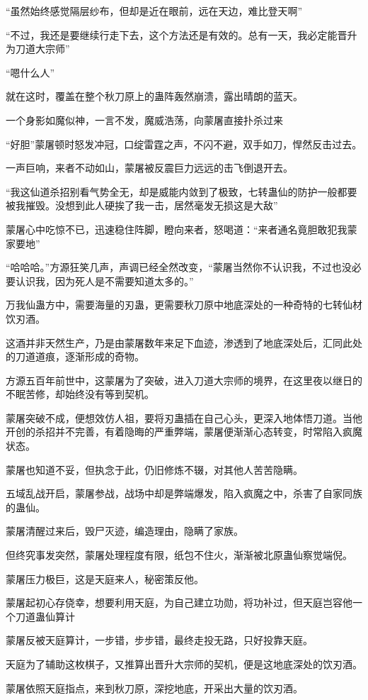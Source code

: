 \begin{this_body}
“虽然始终感觉隔层纱布，但却是近在眼前，远在天边，难比登天啊”

“不过，我还是要继续行走下去，这个方法还是有效的。总有一天，我必定能晋升为刀道大宗师”

“嗯什么人”

就在这时，覆盖在整个秋刀原上的蛊阵轰然崩溃，露出晴朗的蓝天。

一个身影如魔似神，一言不发，魔威浩荡，向蒙屠直接扑杀过来

“好胆”蒙屠顿时怒发冲冠，口绽雷霆之声，不闪不避，双手如刀，悍然反击过去。

一声巨响，来者不动如山，蒙屠被反震巨力远远的击飞倒退开去。

“我这仙道杀招别看气势全无，却是威能内敛到了极致，七转蛊仙的防护一般都要被我摧毁。没想到此人硬挨了我一击，居然毫发无损这是大敌”

蒙屠心中吃惊不已，迅速稳住阵脚，瞪向来者，怒喝道：“来者通名竟胆敢犯我蒙家要地”

“哈哈哈。”方源狂笑几声，声调已经全然改变，“蒙屠当然你不认识我，不过也没必要认识我，因为死人是不需要知道太多的。”

万我仙蛊方中，需要海量的刃蛊，更需要秋刀原中地底深处的一种奇特的七转仙材饮刃酒。

这酒并非天然生产，乃是由蒙屠数年来足下血迹，渗透到了地底深处后，汇同此处的刀道道痕，逐渐形成的奇物。

方源五百年前世中，这蒙屠为了突破，进入刀道大宗师的境界，在这里夜以继日的不眠苦修，却始终没有等到契机。

蒙屠突破不成，便想效仿人祖，要将刃蛊插在自己心头，更深入地体悟刀道。当他开创的杀招并不完善，有着隐晦的严重弊端，蒙屠便渐渐心态转变，时常陷入疯魔状态。

蒙屠也知道不妥，但执念于此，仍旧修炼不辍，对其他人苦苦隐瞒。

五域乱战开启，蒙屠参战，战场中却是弊端爆发，陷入疯魔之中，杀害了自家同族的蛊仙。

蒙屠清醒过来后，毁尸灭迹，编造理由，隐瞒了家族。

但终究事发突然，蒙屠处理程度有限，纸包不住火，渐渐被北原蛊仙察觉端倪。

蒙屠压力极巨，这是天庭来人，秘密策反他。

蒙屠起初心存侥幸，想要利用天庭，为自己建立功勋，将功补过，但天庭岂容他一个刀道蛊仙算计

蒙屠反被天庭算计，一步错，步步错，最终走投无路，只好投靠天庭。

天庭为了辅助这枚棋子，又推算出晋升大宗师的契机，便是这地底深处的饮刃酒。

蒙屠依照天庭指点，来到秋刀原，深挖地底，开采出大量的饮刃酒。


\end{this_body}
